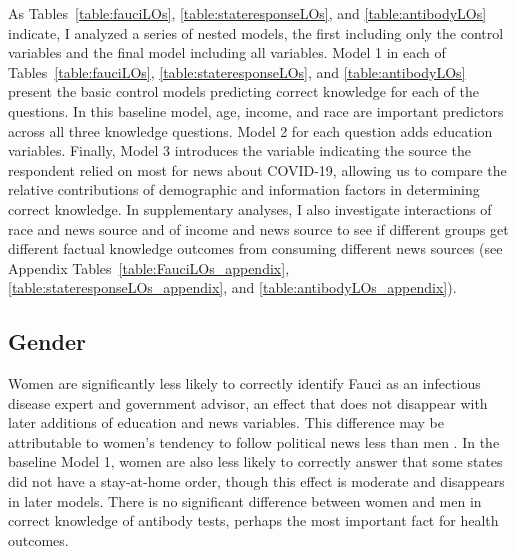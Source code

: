 \documentclass[11pt]{article}
\begin{document}


As Tables~\ref{table:fauciLOs}, \ref{table:stateresponseLOs}, and \ref{table:antibodyLOs} indicate, I analyzed a series of nested models, the first including only the control variables and the final model including all variables. Model 1 in each of Tables~\ref{table:fauciLOs}, \ref{table:stateresponseLOs}, and \ref{table:antibodyLOs} present the basic control models predicting correct knowledge for each of the questions. In this baseline model, age, income, and race are important predictors across all three knowledge questions. Model 2 for each question adds education variables. Finally, Model 3 introduces the variable indicating the source the respondent relied on most for news about COVID-19, allowing us to compare the relative contributions of demographic and information factors in determining correct knowledge. In supplementary analyses, I also investigate interactions of race and news source and of income and news source to see if different groups get different factual knowledge outcomes from consuming different news sources (see Appendix Tables~\ref{table:FauciLOs_appendix}, \ref{table:stateresponseLOs_appendix}, and \ref{table:antibodyLOs_appendix}).






 

 



\subsection{Gender}\label{sec:gender}

Women are significantly less likely to correctly identify Fauci as an infectious disease expert and government advisor, an effect that does not disappear with later additions of education and news variables. This difference may be attributable to women's tendency to follow political news less than men \citep{Verba1997}. In the baseline Model 1, women are also less likely to correctly answer that some states did not have a stay-at-home order, though this effect is moderate and disappears in later models. There is no significant difference between women and men in correct knowledge of antibody tests, perhaps the most important fact for health outcomes.
\end{document}
